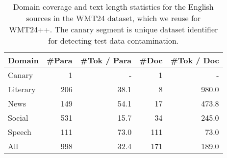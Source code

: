 \begin{table}[]
    \centering
    \begin{adjustbox}{width=\columnwidth}   
    \begin{tabular}{lrrrr}
        \toprule
        \bf Domain & \bf \#Para & \bf \#Tok / Para & \bf \#Doc & \bf \#Tok / Doc \\
        \midrule
        Canary & 1 & - & 1 & - \\
        Literary & 206 & 38.1 & 8 & 980.0 \\
        News & 149 & 54.1 & 17 & 473.8 \\
        Social & 531 & 15.7 & 34 & 245.0 \\
        Speech & 111 & 73.0 & 111 & 73.0 \\
        \midrule
        All & 998 & 32.4 & 171 & 189.0 \\
        \bottomrule
    \end{tabular}
    \end{adjustbox}
    \caption{Domain coverage and text length statistics for the English sources in the WMT24 dataset, which we reuse for WMT24++.
    The canary segment is unique dataset identifier for detecting test data contamination.}
    \label{tab:wmt24_stats}
\end{table}